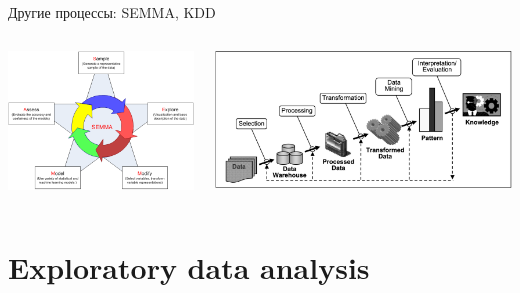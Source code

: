 \documentclass[10pt]{beamer}
\begin{document}
\begin{frame}{Другие процессы: SEMMA, KDD}

\begin{columns}[C]
    \begin{column}{.5\textwidth}
    	\includegraphics[width=\textwidth]{images/semma.png}    	
    \end{column}
       
    \begin{column}{.5\textwidth}
    \vspace{-0em}
	\begin{center}
   		\includegraphics[width=\textwidth]{images/kdd.png}
    \end{center}
    \end{column}
  \end{columns}

\end{frame}

\section{Exploratory data analysis}
\end{document}
